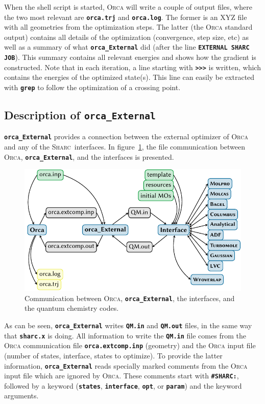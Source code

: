 \documentclass[a4paper,10pt,DIV=15,openany]{scrbook}
\newcommand{\sharc}{\textsc{Sharc}}
\newcommand{\ttt}[1]{\textbf{\texttt{#1}}}
\begin{document}
When the shell script is started, \textsc{Orca} will write a couple of output files, where the two most relevant are \ttt{orca.trj} and \ttt{orca.log}.
The former is an XYZ file with all geometries from the optimization steps.
The latter (the \textsc{Orca} standard output) contains all details of the optimization (convergence, step size, etc) as well as a summary of what \ttt{orca\_External} did (after the line \ttt{EXTERNAL SHARC JOB}).
This summary contains all relevant energies and shows how the gradient is constructed.
Note that in each iteration, a line starting with \ttt{\textgreater\textgreater\textgreater} is written, which contains the energies of the optimized state(s). This line can easily be extracted with \ttt{grep} to follow the optimization of a crossing point.

\subsection{Description of \ttt{orca\_External}}

\ttt{orca\_External} provides a connection between the external optimizer of \textsc{Orca} and any of the \sharc\ interfaces.
In figure~\ref{fig:interface_orcaExt}, the file communication between \textsc{Orca}, \ttt{orca\_External}, and the interfaces is presented.

\begin{figure}[htb]
  \centering
  \includegraphics[scale=1]{img/interfaces/general_orcaExternal.pdf}
  \caption{Communication between \textsc{Orca}, \ttt{orca\_External}, the interfaces, and the quantum chemistry codes.}
  \label{fig:interface_orcaExt}
\end{figure}

As can be seen, \ttt{orca\_External} writes \ttt{QM.in} and \ttt{QM.out} files, in the same way that \ttt{sharc.x} is doing.
All information to write the \ttt{QM.in} file comes from the \textsc{Orca} communication file \ttt{orca.extcomp.inp} (geometry) and the \textsc{Orca} input file (number of states, interface, states to optimize).
To provide the latter information, \ttt{orca\_External} reads specially marked comments from the \textsc{Orca} input file which are ignored by \textsc{Orca}.
These comments start with \ttt{\#SHARC:}, followed by a keyword (\ttt{states}, \ttt{interface}, \ttt{opt}, or \ttt{param}) and the keyword arguments.
\end{document}
